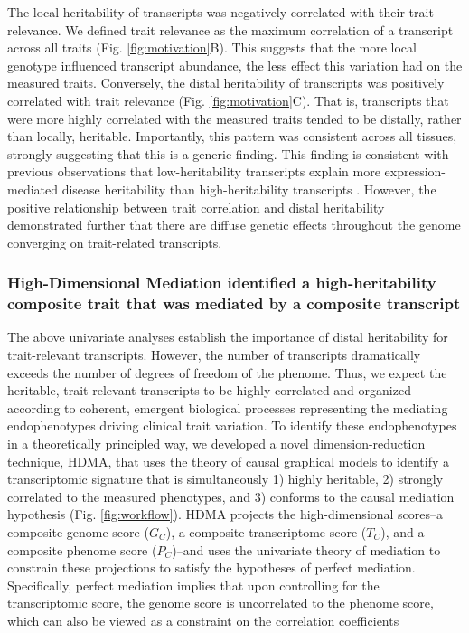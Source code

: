 \documentclass[
]{article}
\begin{document}
The local heritability of transcripts was negatively correlated with
their trait relevance. We defined trait relevance as the maximum
correlation of a transcript across all traits (Fig.
\ref{fig:motivation}B). This suggests that the more local genotype
influenced transcript abundance, the less effect this variation had on
the measured traits. Conversely, the distal heritability of transcripts
was positively correlated with trait relevance (Fig.
\ref{fig:motivation}C). That is, transcripts that were more highly
correlated with the measured traits tended to be distally, rather than
locally, heritable. Importantly, this pattern was consistent across all
tissues, strongly suggesting that this is a generic finding. This
finding is consistent with previous observations that low-heritability
transcripts explain more expression-mediated disease heritability than
high-heritability transcripts \cite{pmid32424349}. However, the positive
relationship between trait correlation and distal heritability
demonstrated further that there are diffuse genetic effects throughout
the genome converging on trait-related transcripts.

\subsubsection{High-Dimensional Mediation identified a high-heritability
composite trait that was mediated by a composite
transcript}\label{high-dimensional-mediation-identified-a-high-heritability-composite-trait-that-was-mediated-by-a-composite-transcript}

The above univariate analyses establish the importance of distal
heritability for trait-relevant transcripts. However, the number of
transcripts dramatically exceeds the number of degrees of freedom of the
phenome. Thus, we expect the heritable, trait-relevant transcripts to be
highly correlated and organized according to coherent, emergent
biological processes representing the mediating endophenotypes driving
clinical trait variation. To identify these endophenotypes in a
theoretically principled way, we developed a novel dimension-reduction
technique, HDMA, that uses the theory of causal graphical models to
identify a transcriptomic signature that is simultaneously 1) highly
heritable, 2) strongly correlated to the measured phenotypes, and 3)
conforms to the causal mediation hypothesis (Fig. \ref{fig:workflow}).
HDMA projects the high-dimensional scores--a composite genome score
(\(G_C\)), a composite transcriptome score (\(T_C\)), and a composite
phenome score (\(P_C\))--and uses the univariate theory of mediation to
constrain these projections to satisfy the hypotheses of perfect
mediation. Specifically, perfect mediation implies that upon controlling
for the transcriptomic score, the genome score is uncorrelated to the
phenome score, which can also be viewed as a constraint on the
correlation coefficients
\end{document}
